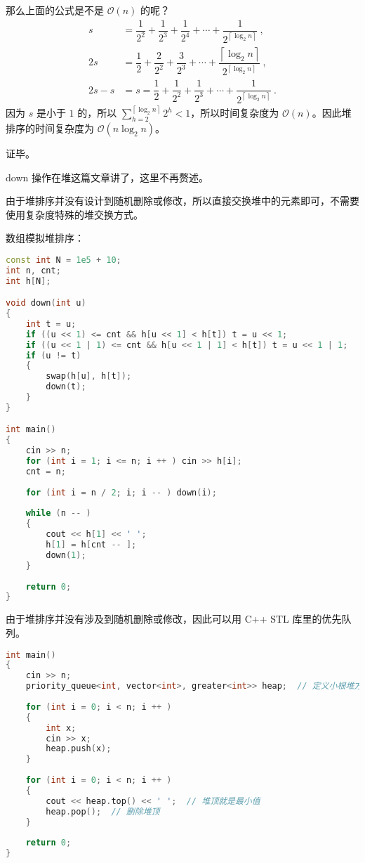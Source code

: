 那么上面的公式是不是 $\mathcal{O}(n)$ 的呢？
\begin{equation}
\begin{aligned}
s &= \dfrac{1}{2^2} + \dfrac{1}{2^3} + \dfrac{1}{2^4} + \cdots +\dfrac{1}{2^{\left\lceil{\log_2 n}\right\rceil}}~,\\
2s &= \dfrac{1}{2} + \dfrac{2}{2^2} + \dfrac{3}{2^3} + \cdots + \dfrac{\left\lceil{\log_2 n}\right\rceil}{2^{\left\lceil{\log_2 n}\right\rceil}}~,\\
2s - s &= s= \dfrac{1}{2} + \dfrac{1}{2^2} + \dfrac{1}{2^3} + \cdots + \dfrac{1}{2^{\left\lceil{\log_2 n}\right\rceil}}~.
\end{aligned}
\end{equation}
因为 $s$ 是小于 $1$ 的，所以 $\sum^{\left\lceil{\log_2 n}\right\rceil} _ {h = 2} 2^h < 1$，所以时间复杂度为 $\mathcal{O}(n)$。因此堆排序的时间复杂度为 $\mathcal{O}(n \log_2 n)$。

证毕。

down 操作在堆这篇文章讲了，这里不再赘述。

 由于堆排序并没有设计到随机删除或修改，所以直接交换堆中的元素即可，不需要使用复杂度特殊的堆交换方式。

数组模拟堆排序：
\begin{lstlisting}[language=cpp]
const int N = 1e5 + 10;
int n, cnt;
int h[N];

void down(int u)
{
    int t = u;
    if ((u << 1) <= cnt && h[u << 1] < h[t]) t = u << 1;
    if ((u << 1 | 1) <= cnt && h[u << 1 | 1] < h[t]) t = u << 1 | 1;
    if (u != t)
    {
        swap(h[u], h[t]);
        down(t);
    }
}

int main()
{
    cin >> n;
    for (int i = 1; i <= n; i ++ ) cin >> h[i];
    cnt = n;
    
    for (int i = n / 2; i; i -- ) down(i);
    
    while (n -- )
    {
        cout << h[1] << ' ';
        h[1] = h[cnt -- ];
        down(1);
    }
    
    return 0;
}
\end{lstlisting}

由于堆排序并没有涉及到随机删除或修改，因此可以用 C++ STL 库里的优先队列。

\begin{lstlisting}[language=cpp]
int main()
{
    cin >> n;
    priority_queue<int, vector<int>, greater<int>> heap;  // 定义小根堆方式
    
    for (int i = 0; i < n; i ++ )
    {
        int x;
        cin >> x;
        heap.push(x);
    }
    
    for (int i = 0; i < n; i ++ )
    {
        cout << heap.top() << ' ';  // 堆顶就是最小值
        heap.pop();  // 删除堆顶
    }
    
    return 0;
}
\end{lstlisting}
